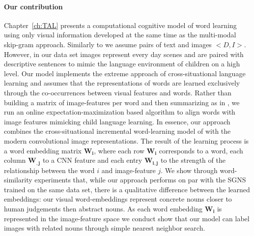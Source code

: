 \paragraph{Our contribution}
Chapter~\ref{ch:TAL} presents a computational cognitive model of word learning using only
visual information developed at the same time as the multi-modal skip-gram approach.
Similarly to \cite{feng2010visual} we assume pairs of text and images
$<D, I>$. However, in our data set images represent every day scenes and are paired with descriptive
sentences to mimic the language environment of children on a high level.
Our model implements the extreme approach of cross-situational language
learning and assumes that the representations of words are learned exclusively through the co-occurrences
between visual features and words. Rather than building a
matrix of image-features per word and then summarizing as in \cite{kiela2014learning},
we run an online expectation-maximization \citep{dempster1977maximum} based
algorithm to align words with image features mimicking child language learning.
In essence, our approach combines the cross-situational incremental word-learning model
of \cite{fazly.etal.10csj} with the modern convolutional image representations.
The result of the learning process is a word embedding matrix $\mathbf{W_i}$,
where each row $\mathbf{W_i}$ corresponds to a word, each column $\mathbf{W_{,j}}$
to a CNN feature and each entry $\mathbf{W_{i,j}}$ to the strength
of the relationship between the word $i$ and image-feature $j$.
We show through word-similarity experiments that, while our approach performs on
par with the SGNS trained on the same data set, there is a qualitative difference between
the learned embeddings: our visual word-embeddings represent concrete nouns closer to human
judgements then abstract nouns. As each word embedding $\mathbf{W_i}$ is represented in the
image-feature space we conduct show that our model can label images with related nouns through
simple nearest neighbor search.

